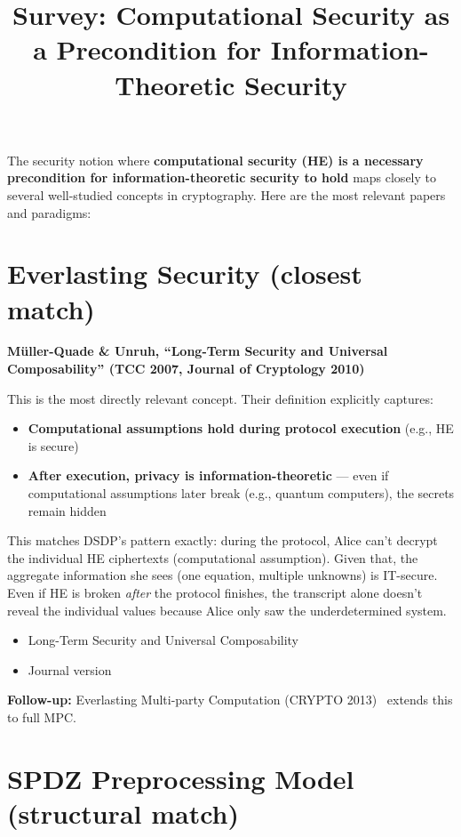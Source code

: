 \documentclass{article}
\title{Survey: Computational Security as a Precondition for Information-Theoretic Security}
\date{}
\begin{document}
\maketitle

The security notion where \textbf{computational security (HE) is a necessary precondition for information-theoretic security to hold} maps closely to several well-studied concepts in cryptography. Here are the most relevant papers and paradigms:

\section{Everlasting Security (closest match)}

\textbf{M\"uller-Quade \& Unruh, ``Long-Term Security and Universal Composability'' (TCC 2007, Journal of Cryptology 2010)}

This is the most directly relevant concept. Their definition explicitly captures:

\begin{itemize}
  \item \textbf{Computational assumptions hold during protocol execution} (e.g., HE is secure)
  \item \textbf{After execution, privacy is information-theoretic} --- even if computational assumptions later break (e.g., quantum computers), the secrets remain hidden
\end{itemize}

This matches DSDP's pattern exactly: during the protocol, Alice can't decrypt the individual HE ciphertexts (computational assumption). Given that, the aggregate information she sees (one equation, multiple unknowns) is IT-secure. Even if HE is broken \emph{after} the protocol finishes, the transcript alone doesn't reveal the individual values because Alice only saw the underdetermined system.

\begin{itemize}
  \item Long-Term Security and Universal Composability~\cite{MullerQuadeUnruh2007}
  \item Journal version~\cite{MullerQuadeUnruh2010}
\end{itemize}

\textbf{Follow-up:} Everlasting Multi-party Computation (CRYPTO 2013)~\cite{Unruh2013} extends this to full MPC.

\section{SPDZ Preprocessing Model (structural match)}
\end{document}

